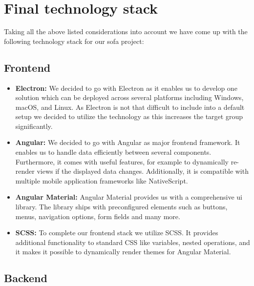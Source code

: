\section{Final technology stack}\label{sec:final-technology-stack}

Taking all the above listed considerations into account we have come up with the following technology stack for our
\ac{sofa} project:

\subsection{Frontend}\label{subsec:frontend}

\begin{itemize}
    \item \textbf{Electron:} We decided to go with Electron as it enables us to develop one solution which can be
        deployed across several platforms including Windows, macOS, and Linux.
        As Electron is not that difficult to include into a default setup we decided to utilize the technology as this
        increases the target group significantly.
    \item \textbf{Angular:} We decided to go with Angular as major frontend framework.
        It enables us to handle data efficiently between several components.
        Furthermore, it comes with useful features, for example to dynamically re-render views if the displayed data
        changes.
        Additionally, it is compatible with multiple mobile application frameworks like NativeScript.
    \item \textbf{Angular Material:} Angular Material provides us with a comprehensive \ac{ui} library.
        The library ships with preconfigured elements such as buttons, menus, navigation options, form fields and many
        more.
    \item \textbf{SCSS:} To complete our frontend stack we utilize SCSS. It provides additional functionality to
        standard CSS like variables, nested operations, and it makes it possible to dynamically render themes for
        Angular Material.
\end{itemize}

\subsection{Backend}\label{subsec:backend}

